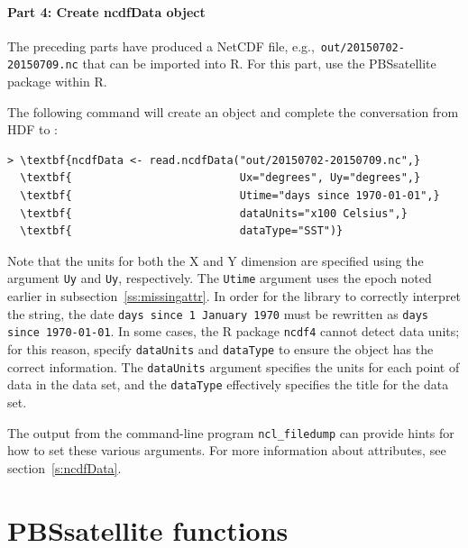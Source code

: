 \documentclass[11pt]{report}
\begin{document}
\subsubsection{Part 4: Create ncdfData object}

The preceding parts have produced a NetCDF file, e.g.,~\verb+out/20150702-20150709.nc+ that can be imported into R.
For this part, use the PBSsatellite package within R.

The following command will create an  object and complete the conversation from HDF to :
\begin{Verbatim}[xleftmargin=0.5in,commandchars=\\\{\}]
> \textbf{ncdfData <- read.ncdfData("out/20150702-20150709.nc",}
  \textbf{                          Ux="degrees", Uy="degrees",}
  \textbf{                          Utime="days since 1970-01-01",}
  \textbf{                          dataUnits="x100 Celsius",}
  \textbf{                          dataType="SST")}
\end{Verbatim}
Note that the units for both the X and Y dimension are specified using the argument \texttt{Uy} and \texttt{Uy}, respectively.
The \texttt{Utime} argument uses the epoch noted earlier in subsection~\ref{ss:missingattr}.
In order for the library to correctly interpret the string, the date \texttt{days since 1 January 1970} must be rewritten as \texttt{days since 1970-01-01}.
In some cases, the R package \texttt{ncdf4} cannot detect data units; for this reason, specify \texttt{dataUnits} and \texttt{dataType} to ensure the  object has the correct information.
The \texttt{dataUnits} argument specifies the units for each point of data in the data set, and the \texttt{dataType} effectively specifies the title for the data set.

The output from the command-line program \lstinline{ncl_filedump} can provide hints for how to set these various arguments.
For more information about  attributes, see section~\ref{s:ncdfData}.

\chapter{PBSsatellite functions}
\label{c:PBSsatelliteFunctions}



\printbibliography[heading=bibintoc]
\end{document}
